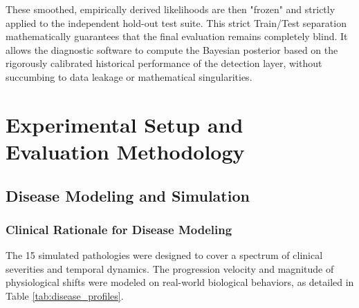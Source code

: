 \documentclass[sigconf]{acmart}
\begin{document}
These smoothed, empirically derived likelihoods are then "frozen" and strictly applied to the independent hold-out test suite. This strict Train/Test separation mathematically guarantees that the final evaluation remains completely blind. It allows the diagnostic software to compute the Bayesian posterior based on the rigorously calibrated historical performance of the detection layer, without succumbing to data leakage or mathematical singularities.


\section{Experimental Setup and Evaluation Methodology}

\subsection{Disease Modeling and Simulation}

\subsubsection{Clinical Rationale for Disease Modeling} \label{sec:Diseases}
The 15 simulated pathologies were designed to cover a spectrum of clinical severities and temporal dynamics. The progression velocity and magnitude of physiological shifts were modeled on real-world biological behaviors, as detailed in Table \ref{tab:disease_profiles}.
\end{document}
